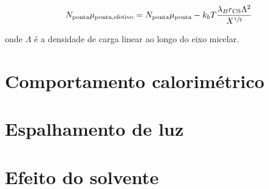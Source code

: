 		\begin{equation}
			N_\mathrm{ponta}\mu_\mathrm{ponta, efetivo} = N_\mathrm{ponta}\mu_\mathrm{ponta} - k_b T \dfrac{\lambda_B r_\mathrm{CS} \Lambda^2}{X^{\sfrac{1}{2}}}
		\end{equation}
		
		\noindent onde \(\Lambda\) é a densidade de carga linear ao longo do eixo micelar.
		
	
		\section{Comportamento calorimétrico}
		
		\section{Espalhamento de luz}
		
		
		
		\section{Efeito do solvente}
		\label{sec:efeito_solvente}
		
		
